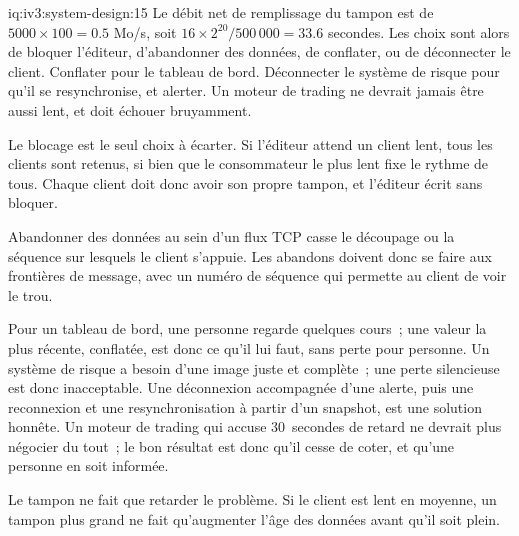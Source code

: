 \begin{solution}{iq:iv3:system-design:15}
Le débit net de remplissage du tampon est de $5000 \times 100 = 0.5$ Mo/s, soit $16 \times 2^{20} / 500\,000 = 33.6$ secondes. Les choix sont alors de bloquer l'éditeur, d'abandonner des données, de conflater, ou de déconnecter le client. Conflater pour le tableau de bord. Déconnecter le système de risque pour qu'il se resynchronise, et alerter. Un moteur de trading ne devrait jamais être aussi lent, et doit échouer bruyamment.

Le blocage est le seul choix à écarter. Si l'éditeur attend un client lent, tous les clients sont retenus, si bien que le consommateur le plus lent fixe le rythme de tous. Chaque client doit donc avoir son propre tampon, et l'éditeur écrit sans bloquer.

Abandonner des données au sein d'un flux TCP casse le découpage ou la séquence sur lesquels le client s'appuie. Les abandons doivent donc se faire aux frontières de message, avec un numéro de séquence qui permette au client de voir le trou.

Pour un tableau de bord, une personne regarde quelques cours~; une valeur la plus récente, conflatée, est donc ce qu'il lui faut, sans perte pour personne. Un système de risque a besoin d'une image juste et complète~; une perte silencieuse est donc inacceptable. Une déconnexion accompagnée d'une alerte, puis une reconnexion et une resynchronisation à partir d'un snapshot, est une solution honnête. Un moteur de trading qui accuse 30~secondes de retard ne devrait plus négocier du tout~; le bon résultat est donc qu'il cesse de coter, et qu'une personne en soit informée.

Le tampon ne fait que retarder le problème. Si le client est lent en moyenne, un tampon plus grand ne fait qu'augmenter l'âge des données avant qu'il soit plein.

\end{solution}

